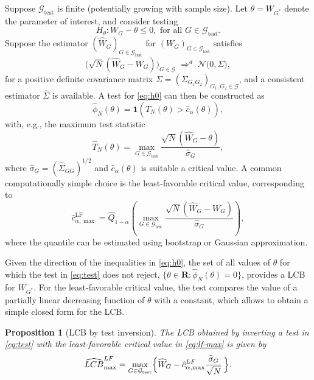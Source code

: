 \documentclass[12pt]{article}
\numberwithin{equation}{section}
\theoremstyle{plain}                         %
\newtheorem{proposition}{Proposition}
\theoremstyle{definition}                  %
\theoremstyle{remark}                      %
\begin{document}
Suppose $\mathcal{G}_{\text{test}}$ is finite (potentially growing with sample size). Let $\theta = W_{G^*}$ denote the parameter of interest, and consider testing
\begin{equation} \label{eq:h0}
	H_{\theta}:  W_{G} - \theta \leq 0, \text{ for all } G \in \mathcal{G}_{\text{test}}.
\end{equation}
Suppose the estimator \((\widehat W_G)_{G\in\mathcal{G}_{\text{test}}} \) for \( (W_G)_{G\in\mathcal{G}_{\text{test}}}\) satisfies
\begin{equation} \label{eq:clt}
\bigl(\sqrt{N}(\widehat W_G - W_G)\bigr)_{G\in\mathcal{G}}
\;\Rightarrow^d\;
\mathcal{N}\bigl(0,\Sigma\bigr),
\end{equation}
for a positive definite covariance matrix $\Sigma= (\Sigma_{G_1G_2})_{G_1, G_2 \in \mathcal{G}}$, and a consistent estimator $\widehat{\Sigma}$ is available. A test for \eqref{eq:h0} can then be constructed as
\begin{equation} \label{eq:test}
\hat{\phi}_N(\theta) = \bm{1} \left( \hat{T}_N(\theta) > \hat{c}_{\alpha}(\theta)  \right),
\end{equation}
with, e.g., the maximum test statistic
\begin{equation}
\widehat{T}_N(\theta) = \max \limits_{G \in \mathcal{G}_{\text{test}}} \frac{\sqrt{N}(\widehat{W}_G - \theta)}{\hat{\sigma}_{G}},
\end{equation}
where $\hat{\sigma}_{G} = (\widehat{\Sigma}_{GG})^{1/2}$ and $\hat{c}_{\alpha}(\theta)$ is suitable a critical value. A common computationally simple choice is the least-favorable critical value, corresponding to 
\begin{equation} \label{eq:lf-max}
\hat{c}_{\alpha, \max}^{\text{LF}} = \hat{Q}_{1-\alpha}\left( \max \limits_{G \in \mathcal{G}_{\text{test}}} \frac{\sqrt{N}(\widehat{W}_G - W_G)}{\hat{\sigma}_G} \right),
\end{equation}
where the quantile can be estimated using bootstrap or Gaussian approximation.

 Given the direction of the inequalities in \eqref{eq:h0}, the set of all values of $\theta$ for which the test in \eqref{eq:test} does not reject, $\{\theta \in \mathbf{R}: \hat{\phi}_N(\theta) = 0\}$, provides a LCB for $W_{G^*}$. For the least-favorable critical value, the test compares the value of a partially linear decreasing function of $\theta$ with a constant, which allows to obtain a simple closed form for the LCB. 


\begin{proposition}[LCB by test inversion]
\label{prop:max}
The LCB obtained by inverting a test in \eqref{eq:test} with the least-favorable critical value in \eqref{eq:lf-max} is given by
\begin{equation} \label{eq:lcb_max_lf}
\widehat{LCB}_{\max}^{LF} =
\max_{G\in\mathcal G_{\text{\normalfont test}}}
\Bigl\{
\widehat W_G - \hat{c}_{\alpha, \max}^{LF}\frac{\widehat \sigma_G}{\sqrt{N}}\,
\Bigr\}.
\end{equation}
\end{proposition}
\end{document}
